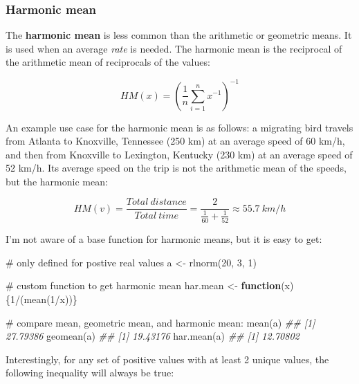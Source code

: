 \documentclass[
  13,
  letterpaper,
]{report}
\newenvironment{Shaded}{\begin{snugshade}}{\end{snugshade}}
\newcommand{\CommentTok}[1]{\textcolor[rgb]{0.37,0.37,0.37}{#1}}
\newcommand{\ControlFlowTok}[1]{\textcolor[rgb]{0.00,0.23,0.31}{\textbf{#1}}}
\newcommand{\DecValTok}[1]{\textcolor[rgb]{0.68,0.00,0.00}{#1}}
\newcommand{\DocumentationTok}[1]{\textcolor[rgb]{0.37,0.37,0.37}{\textit{#1}}}
\newcommand{\FunctionTok}[1]{\textcolor[rgb]{0.28,0.35,0.67}{#1}}
\newcommand{\NormalTok}[1]{\textcolor[rgb]{0.00,0.23,0.31}{#1}}
\newcommand{\OtherTok}[1]{\textcolor[rgb]{0.00,0.23,0.31}{#1}}
\newcommand{\SpecialCharTok}[1]{\textcolor[rgb]{0.37,0.37,0.37}{#1}}
\begin{document}
\subsubsection{Harmonic mean}\label{sec-06-cen-mean-hm}

The \textbf{harmonic mean} is less common than the arithmetic or
geometric means. It is used when an average \emph{rate} is needed. The
harmonic mean is the reciprocal of the arithmetic mean of reciprocals of
the values:

\[HM\left(x\right)=\left(\frac{1}{n}\sum_{i=1}^{n}x^{-1}\right)^{-1}\]

An example use case for the harmonic mean is as follows: a migrating
bird travels from Atlanta to Knoxville, Tennessee (250 km) at an average
speed of 60 km/h, and then from Knoxville to Lexington, Kentucky (230
km) at an average speed of 52 km/h. Its average speed on the trip is not
the arithmetic mean of the speeds, but the harmonic mean:

\[HM\left(v\right)=\frac{Total\ distance}{Total\ time}=\frac{2}{\frac{1}{60}+\frac{1}{52}}\approx55.7\ km/h\]

I'm not aware of a base function for harmonic means, but it is easy to
get:

\begin{Shaded}
\begin{Highlighting}[]

\CommentTok{\# only defined for postive real values}
\NormalTok{a }\OtherTok{\textless{}{-}} \FunctionTok{rlnorm}\NormalTok{(}\DecValTok{20}\NormalTok{, }\DecValTok{3}\NormalTok{, }\DecValTok{1}\NormalTok{)}

\CommentTok{\# custom function to get harmonic mean}
\NormalTok{har.mean }\OtherTok{\textless{}{-}} \ControlFlowTok{function}\NormalTok{(x)\{}\DecValTok{1}\SpecialCharTok{/}\NormalTok{(}\FunctionTok{mean}\NormalTok{(}\DecValTok{1}\SpecialCharTok{/}\NormalTok{x))\}}

\CommentTok{\# compare mean, geometric mean, and harmonic mean:}
\FunctionTok{mean}\NormalTok{(a)}
\DocumentationTok{\#\# [1] 27.79386}
\FunctionTok{geomean}\NormalTok{(a)}
\DocumentationTok{\#\# [1] 19.43176}
\FunctionTok{har.mean}\NormalTok{(a)}
\DocumentationTok{\#\# [1] 12.70802}
\end{Highlighting}
\end{Shaded}

Interestingly, for any set of positive values with at least 2 unique
values, the following inequality will always be true:
\end{document}

